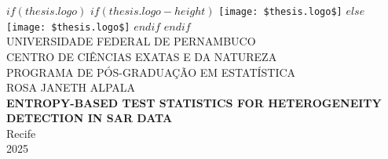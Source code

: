  \makeatletter
\renewcommand{\cleardoublepage}{\clearpage} %
\makeatother






\begin{titlepage}
  \begin{center}
  
			$if(thesis.logo)$
			$if(thesis.logo-height)$
			\texttt{[image: \$thesis.logo\$]} %
			$else$
			\texttt{[image: \$thesis.logo\$]}
			$endif$
			$endif$\\[0.3cm]
    
    {\normalsize\MakeUppercase{UNIVERSIDADE FEDERAL DE PERNAMBUCO}}\\
    {\normalsize\MakeUppercase{CENTRO DE CIÊNCIAS EXATAS E DA NATUREZA}}\\
    {\normalsize\MakeUppercase{PROGRAMA DE PÓS-GRADUAÇÃO EM ESTATÍSTICA}}\\ [4cm]
		
    {\normalsize ROSA JANETH ALPALA}\\[4cm]
    
    {\normalsize \textbf{ENTROPY-BASED TEST STATISTICS FOR HETEROGENEITY DETECTION IN SAR DATA}}\\[6.19cm]

		
%
   {\normalsize Recife}\\
   {\normalsize 2025}
    
  \end{center}
\end{titlepage} %
\cleardoublepage

